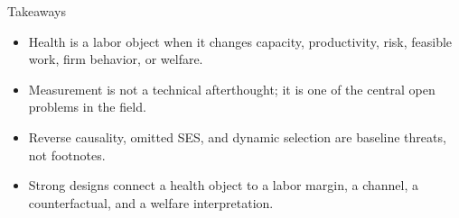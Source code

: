\documentclass[aspectratio=169,11pt]{beamer}
\begin{document}
\begin{frame}{Takeaways}
\begin{itemize}
    \item Health is a labor object when it changes capacity, productivity, risk, feasible work, firm behavior, or welfare.
    \item Measurement is not a technical afterthought; it is one of the central open problems in the field.
    \item Reverse causality, omitted SES, and dynamic selection are baseline threats, not footnotes.
    \item Strong designs connect a health object to a labor margin, a channel, a counterfactual, and a welfare interpretation.
\end{itemize}
\end{frame}
\end{document}
